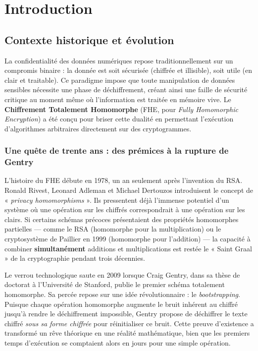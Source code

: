 \chapter{Introduction}

\section{Contexte historique et évolution}

La confidentialité des données numériques repose traditionnellement sur un compromis binaire : la donnée est soit sécurisée (chiffrée et illisible), soit utile (en clair et traitable). Ce paradigme impose que toute manipulation de données sensibles nécessite une phase de déchiffrement, créant ainsi une faille de sécurité critique au moment même où l'information est traitée en mémoire vive. Le \textbf{Chiffrement Totalement Homomorphe} (FHE, pour \textit{Fully Homomorphic Encryption}) a été conçu pour briser cette dualité en permettant l'exécution d'algorithmes arbitraires directement sur des cryptogrammes.

\subsection{Une quête de trente ans : des prémices à la rupture de Gentry}

L'histoire du FHE débute en 1978, un an seulement après l'invention du RSA. Ronald Rivest, Leonard Adleman et Michael Dertouzos introduisent le concept de « \textit{privacy homomorphisms} ». Ils pressentent déjà l'immense potentiel d'un système où une opération sur les chiffrés correspondrait à une opération sur les clairs. Si certains schémas précoces présentaient des propriétés homomorphes partielles — comme le RSA (homomorphe pour la multiplication) ou le cryptosystème de Paillier en 1999 (homomorphe pour l'addition) — la capacité à combiner \textbf{simultanément} additions et multiplications est restée le « Saint Graal » de la cryptographie pendant trois décennies.

Le verrou technologique saute en 2009 lorsque Craig Gentry, dans sa thèse de doctorat à l'Université de Stanford, publie le premier schéma totalement homomorphe. Sa percée repose sur une idée révolutionnaire : le \textit{bootstrapping}. Puisque chaque opération homomorphe augmente le bruit inhérent au chiffré jusqu'à rendre le déchiffrement impossible, Gentry propose de déchiffrer le texte chiffré \textit{sous sa forme chiffrée} pour réinitialiser ce bruit. Cette preuve d'existence a transformé un rêve théorique en une réalité mathématique, bien que les premiers temps d'exécution se comptaient alors en jours pour une simple opération.

